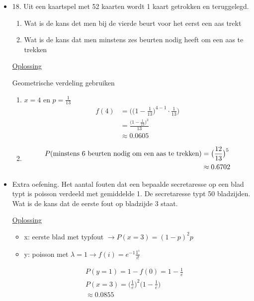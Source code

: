 \documentclass[12pt]{report}
\newcommand{\exercise}[2]{
  #1
  

  \underline{Oplossing}
  
  #2
  
    \hrulefill
}
\begin{document}
\begin{itemize}[label={}]
{{    }
 }
 \item {
    \exercise{ 
        18. Uit een kaartspel met 52 kaarten wordt 1 kaart getrokken en teruggelegd.
        \begin{enumerate}
         \item Wat is de kans det men bij de vierde beurt voor het eerst een aas trekt
         \item Wat is de kans dat men minstens zes beurten nodig heeft om een aas te trekken
        \end{enumerate}
    }{
        Geometrische verdeling gebruiken
        \begin{enumerate}
         \item $x = 4$ en $p = \frac{1}{13}$
            \begin{equation*}
            \begin{split}
            f(4) & = \bigg(\big(1 - \frac{1}{13}\big)^{4 - 1}\cdot\frac{1}{13}\bigg) \\
                    & = \frac{\big(1 - \frac{1}{13}\big)^{3}}{13} \\
                    & \approx 0.0605
            \end{split}
            \end{equation*}
         \item 
            \begin{equation*}
             \begin{split}
              P(\hbox{minstens 6 beurten nodig om een aas te trekken}) & = \big(\frac{12}{13}\big)^{5} \\
              & \approx 0.6702
             \end{split}
            \end{equation*}
        \end{enumerate}
    }
 }
 \item{
    \exercise{
        Extra oefening. Het aantal fouten dat een bepaalde secretaresse op een blad typt is poisson verdeeld met gemiddelde 1. De secretaresse typt 50 bladzijden. Wat is de kans dat de eerste fout op bladzijde 3 staat.
    }{
        \begin{itemize}
            \item x: eerste blad met typfout $\rightarrow P(x = 3) = (1 - p)^2p$
            \item y: poisson met $\lambda = 1 \rightarrow f(i) = e^{-1}\frac{1^i}{i!}$
        \end{itemize}
        \begin{equation*}
         \begin{split}
          & P(y = 1) = 1 - f(0) = 1 - \frac{1}{e} \\
          & P(x = 3) = \big(\frac{1}{e}\big)^{2}\big(1 -\frac{1}{e}\big) \\
          & \approx 0.0855
         \end{split}
        \end{equation*}

    }
 }
\end{itemize}
\end{document}
